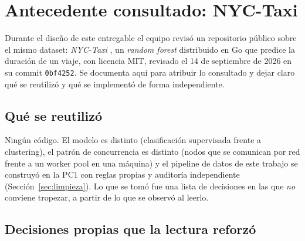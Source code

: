 \section{Antecedente consultado: NYC-Taxi}\label{sec:antecedente}

Durante el diseño de este entregable el equipo revisó un repositorio público sobre el mismo
dataset: \emph{NYC-Taxi} \parencite{hexed2026nyctaxi}, un \emph{random forest} distribuido en Go
que predice la duración de un viaje, con licencia MIT, revisado el 14 de septiembre de 2026 en su
commit \texttt{0bf4252}. Se documenta aquí para atribuir lo consultado y dejar claro qué se
reutilizó y qué se implementó de forma independiente.

\subsection{Qué se reutilizó}

Ningún código. El modelo es distinto (clasificación supervisada frente a clustering), el patrón de
concurrencia es distinto (nodos que se comunican por red frente a un worker pool en una máquina) y
el pipeline de datos de este trabajo se construyó en la PC1 con reglas propias y auditoría
independiente (Sección~\ref{sec:limpieza}). Lo que se tomó fue una lista de decisiones en las que
\emph{no} conviene tropezar, a partir de lo que se observó al leerlo.

\subsection{Decisiones propias que la lectura reforzó}

